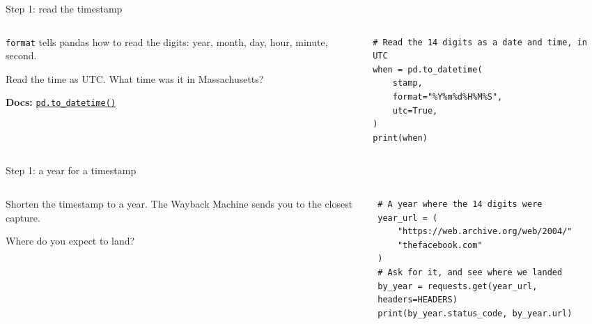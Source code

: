 \documentclass[9pt,aspectratio=169]{beamer}
\begin{document}
\begin{frame}[fragile]{Step 1: read the timestamp}
    \begin{columns}[T]
        \begin{column}{0.37\textwidth}
            \texttt{format} tells pandas how to read the digits: year, month, day, hour, minute, second.

            \medskip
            Read the time as UTC. What time was it in Massachusetts?

            \medskip
            {\scriptsize\textbf{Docs:} \href{https://pandas.pydata.org/docs/reference/api/pandas.to_datetime.html}{\texttt{pd.to\_datetime()}}\par}
        \end{column}
        \begin{column}{0.6\textwidth}
\begin{lstlisting}
# Read the 14 digits as a date and time, in UTC
when = pd.to_datetime(
    stamp,
    format="%Y%m%d%H%M%S",
    utc=True,
)
print(when)
\end{lstlisting}
        \end{column}
    \end{columns}
\end{frame}

\begin{frame}[fragile]{Step 1: a year for a timestamp}
    \begin{columns}[T]
        \begin{column}{0.37\textwidth}
            Shorten the timestamp to a year. The Wayback Machine sends you to the closest capture.

            \medskip
            Where do you expect to land?
        \end{column}
        \begin{column}{0.6\textwidth}
\begin{lstlisting}
# A year where the 14 digits were
year_url = (
    "https://web.archive.org/web/2004/"
    "thefacebook.com"
)
# Ask for it, and see where we landed
by_year = requests.get(year_url, headers=HEADERS)
print(by_year.status_code, by_year.url)
\end{lstlisting}
        \end{column}
    \end{columns}
\end{frame}
\end{document}
